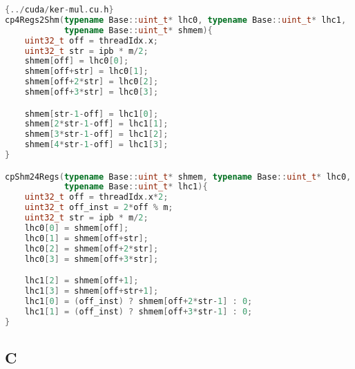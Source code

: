 \begin{lstlisting}[language=CPP,caption={\footnotesize CUDA convolution memory
transactions of \textit{convmul} with sequentialization factor of 4 to prepare
calling \textit{badd} on the four pairs of parts in registers, from file
\texttt{ker-mul.cu.h} (slightly edited), with base class \texttt{Base}, big integer size \texttt{m}, and \texttt{ipb} instances per block.},label={cudamulmem},firstnumber=106]{../cuda/ker-mul.cu.h}
cp4Regs2Shm(typename Base::uint_t* lhc0, typename Base::uint_t* lhc1,
            typename Base::uint_t* shmem){
    uint32_t off = threadIdx.x;
    uint32_t str = ipb * m/2;
    shmem[off] = lhc0[0];
    shmem[off+str] = lhc0[1];
    shmem[off+2*str] = lhc0[2];
    shmem[off+3*str] = lhc0[3];

    shmem[str-1-off] = lhc1[0];
    shmem[2*str-1-off] = lhc1[1];
    shmem[3*str-1-off] = lhc1[2];
    shmem[4*str-1-off] = lhc1[3];
}

cpShm24Regs(typename Base::uint_t* shmem, typename Base::uint_t* lhc0,
            typename Base::uint_t* lhc1){
    uint32_t off = threadIdx.x*2;
    uint32_t off_inst = 2*off % m;
    uint32_t str = ipb * m/2;
    lhc0[0] = shmem[off];
    lhc0[1] = shmem[off+str];
    lhc0[2] = shmem[off+2*str];
    lhc0[3] = shmem[off+3*str];

    lhc1[2] = shmem[off+1];
    lhc1[3] = shmem[off+str+1];
    lhc1[0] = (off_inst) ? shmem[off+2*str-1] : 0;
    lhc1[1] = (off_inst) ? shmem[off+3*str-1] : 0;
}
\end{lstlisting}

\bigskip

\subsection*{C}
\label{app:C}

